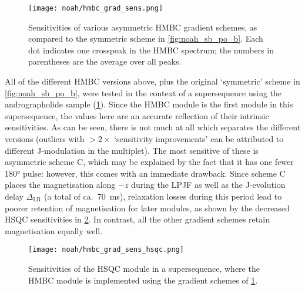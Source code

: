 \begin{figure}[htb]
    \centering
    \texttt{[image: noah/hmbc\_grad\_sens.png]}%
    \caption[Comparison of relative sensitivities of HMBC gradient schemes]{
        Sensitivities of various asymmetric HMBC gradient schemes, as compared to the symmetric scheme in \cref{fig:noah_sb_po_b}.
        Each dot indicates one crosspeak in the HMBC spectrum; the numbers in parentheses are the average over all peaks.
    }
    \label{fig:hmbc_grad_sens}
\end{figure}

All of the different HMBC versions above, plus the original `symmetric' scheme in \cref{fig:noah_sb_po_b}, were tested in the context of a  supersequence using the andrographolide sample (\cref{fig:hmbc_grad_sens}).
Since the HMBC module is the first module in this supersequence, the values here are an accurate reflection of their intrinsic sensitivities.
As can be seen, there is not much at all which separates the different versions (outliers with $>2\times$ `sensitivity improvements' can be attributed to different J-modulation in the multiplet).
The most sensitive of these is asymmetric scheme C, which may be explained by the fact that it has one fewer \ang{180} pulse: however, this comes with an immediate drawback.
Since scheme C places the  magnetisation along $-z$ during the LPJF as well as the J-evolution delay $\Delta_\text{LR}$ (a total of ca.\ \qty{70}{\ms}), relaxation losses during this period lead to poorer retention of  magnetisation for later modules, as shown by the decreased HSQC sensitivities in \cref{fig:hmbc_grad_sens_hsqc}.
In contrast, all the other gradient schemes retain  magnetisation equally well.

\begin{figure}[htb]
    \centering
    \texttt{[image: noah/hmbc\_grad\_sens\_hsqc.png]}%
    \caption[Effect of HMBC gradient scheme on HSQC sensitivity in a  supersequence]{
        Sensitivities of the HSQC module in a  supersequence, where the HMBC module is implemented using the gradient schemes of \cref{fig:hmbc_grad_sens}.
    }
    \label{fig:hmbc_grad_sens_hsqc}
\end{figure}

